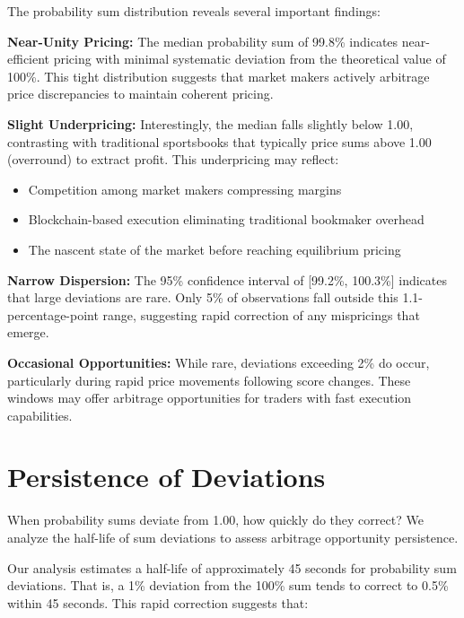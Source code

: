 The probability sum distribution reveals several important findings:

\textbf{Near-Unity Pricing:} The median probability sum of 99.8\% indicates near-efficient pricing with minimal systematic deviation from the theoretical value of 100\%. This tight distribution suggests that market makers actively arbitrage price discrepancies to maintain coherent pricing.

\textbf{Slight Underpricing:} Interestingly, the median falls slightly below 1.00, contrasting with traditional sportsbooks that typically price sums above 1.00 (overround) to extract profit. This underpricing may reflect:
\begin{itemize}
    \item Competition among market makers compressing margins
    \item Blockchain-based execution eliminating traditional bookmaker overhead
    \item The nascent state of the market before reaching equilibrium pricing
\end{itemize}

\textbf{Narrow Dispersion:} The 95\% confidence interval of [99.2\%, 100.3\%] indicates that large deviations are rare. Only 5\% of observations fall outside this 1.1-percentage-point range, suggesting rapid correction of any mispricings that emerge.

\textbf{Occasional Opportunities:} While rare, deviations exceeding 2\% do occur, particularly during rapid price movements following score changes. These windows may offer arbitrage opportunities for traders with fast execution capabilities.

\section{Persistence of Deviations}

When probability sums deviate from 1.00, how quickly do they correct? We analyze the half-life of sum deviations to assess arbitrage opportunity persistence.

Our analysis estimates a half-life of approximately 45 seconds for probability sum deviations. That is, a 1\% deviation from the 100\% sum tends to correct to 0.5\% within 45 seconds. This rapid correction suggests that:


